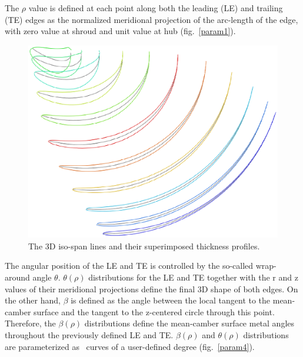 
The $\rho$ value is defined at each point along both the leading (LE) and trailing (TE) edges as the normalized meridional projection of the arc-length of the edge, with zero value at shroud and unit value at hub (fig.\ \ref{param1}). 

\begin{figure}[h!]
\centering
\includegraphics[width=120mm]{param3.eps} 
\caption{The 3D iso-span lines and their superimposed thickness profiles.}
\label{param3}
\end{figure}

The angular position of the LE and TE is controlled by the so-called wrap-around angle $\theta$. %
$\theta(\rho)$ distributions for the LE and TE together with the r and z values of their meridional projections define the final 3D shape of both edges. On the other hand, $\beta$ is defined as the angle between the local tangent to the mean-camber surface and the tangent to the z-centered circle through this point. Therefore, the $\beta(\rho)$ distributions define the mean-camber surface metal angles throughout the previously defined LE and TE. $\beta(\rho)$ and $\theta(\rho)$ distributions are parameterized as \Bezier\ curves of a user-defined degree (fig.\ \ref{param4}).  


